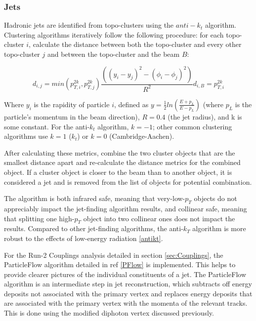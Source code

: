 \subsubsection{Jets} \label{sec:Jets} 

Hadronic jets are identified from topo-clusters using the $anti-k_{t}$ algorithm. Clustering algorithms iteratively follow the following procedure: for each topo-cluster $i$, calculate the distance between both the topo-cluster and every other topo-cluster $j$ and between the topo-cluster and the beam $B$: 

\begin{equation} 
d_{i,j} = min(p_{T,i}^{2k}, p_{T,j}^{2k})\frac{((y_{i}-y_{j})^{2}-(\phi_{i}-\phi_{j})^{2})}{R^2}
d_{i,B} = p_{T,i}^{2k}
\end{equation} 

Where $y_{i}$ is the rapidity of particle $i$, defined as $y=\frac{1}{2} ln(\frac{ E + p_{L}}{ E - p_{L}})$ (where $p_{L}$ is the particle's momentum in the beam direction), $R = 0.4$ (the jet radius), and k is some constant. For the anti-$k_{t}$ algorithm, $k = -1$; other common clustering algorithms use $k=1$ ($k_{t}$) or $k=0$ (Cambridge-Aachen). 

After calculating these metrics, combine the two cluster objects that are the smallest distance apart and re-calculate the distance metrics for the combined object. If a cluster object is closer to the beam than to another object, it is considered a jet and is removed from the list of objects for potential combination.

The algorithm is both infrared safe, meaning that very-low-$p_{T}$ objects do not appreciably impact the jet-finding algorithm results, and collinear safe, meaning that splitting one high-$p_{T}$ object into two collinear ones does not impact the results. Compared to other jet-finding algorithms, the anti-$k_{T}$ algorithm is more robust to the effects of low-energy radiation \ref{antikt}.

For the Run-2 Couplings analysis detailed in section \ref{sec:Couplings}, the ParticleFlow algorithm detailed in ref \ref{PFlow} is implemented. This helps to provide clearer pictures of the individual constituents of a jet. The ParticleFlow algorithm is an intermediate step in jet reconstruction, which subtracts off energy deposits not associated with the primary vertex and replaces energy deposits that are associated with the primary vertex with the momenta of the relevant tracks. This is done using the modified diphoton vertex discussed previously.

